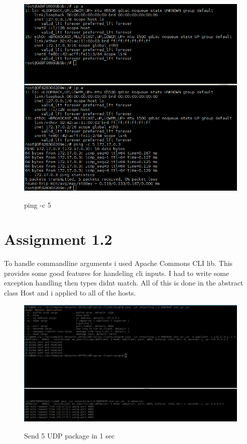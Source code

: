 \documentclass[a4paper,12pt]{article} %
\begin{document}
{\begin{figure}[H]
    \centering  
    \includegraphics[scale=0.5]{img/assignment11.png}
	\label{fig:assignment11}
	\caption{ping -c 5}
\end{figure}



\section{Assignment 1.2}

To handle commandline arguments i used Apache Commons CLI lib.
This provides some good features for handeling cli inputs.
I had to write some exception handling then types didnt match.
All of this is done in the abstract class Host and i applied to all
of the hosts.

\begin{figure}[H]
    \centering  
    \includegraphics[scale=0.35]{img/assignment12.png}
	\label{fig:assignment12}
	\caption{Send 5 UDP package in 1 sec}
\end{figure}


}
\end{document}
